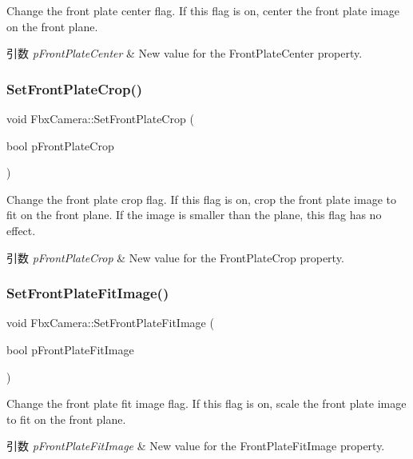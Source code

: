 Change the front plate center flag. If this flag is on, center the front plate image on the front plane. 
\begin{DoxyParams}{引数}
{\em p\+Front\+Plate\+Center} & New value for the Front\+Plate\+Center property. \\
\hline
\end{DoxyParams}
\mbox{\label{class_fbx_camera_abbd757d8635730909318bb9a7c5ec861}} 
\subsubsection{\texorpdfstring{Set\+Front\+Plate\+Crop()}{SetFrontPlateCrop()}}
{\footnotesize\ttfamily void Fbx\+Camera\+::\+Set\+Front\+Plate\+Crop (\begin{DoxyParamCaption}\item[{bool}]{p\+Front\+Plate\+Crop }\end{DoxyParamCaption})}

Change the front plate crop flag. If this flag is on, crop the front plate image to fit on the front plane. If the image is smaller than the plane, this flag has no effect. 
\begin{DoxyParams}{引数}
{\em p\+Front\+Plate\+Crop} & New value for the Front\+Plate\+Crop property. \\
\hline
\end{DoxyParams}
\mbox{\label{class_fbx_camera_abecdf19fbd784cc116fe9ae2916cd3c7}} 
\subsubsection{\texorpdfstring{Set\+Front\+Plate\+Fit\+Image()}{SetFrontPlateFitImage()}}
{\footnotesize\ttfamily void Fbx\+Camera\+::\+Set\+Front\+Plate\+Fit\+Image (\begin{DoxyParamCaption}\item[{bool}]{p\+Front\+Plate\+Fit\+Image }\end{DoxyParamCaption})}

Change the front plate fit image flag. If this flag is on, scale the front plate image to fit on the front plane. 
\begin{DoxyParams}{引数}
{\em p\+Front\+Plate\+Fit\+Image} & New value for the Front\+Plate\+Fit\+Image property. \\
\hline
\end{DoxyParams}
\mbox{\label{class_fbx_camera_a8c39b7ce7738bf7b2ef6993ff45312f0}} 

